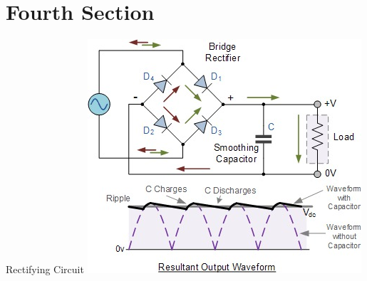 \documentclass{beamer}
\begin{document}
\section*{Fourth Section}
\begin{frame}{Rectifying Circuit}
\centering
\includegraphics[scale=2]{diode23.jpg}
\end{frame}
\end{document}

